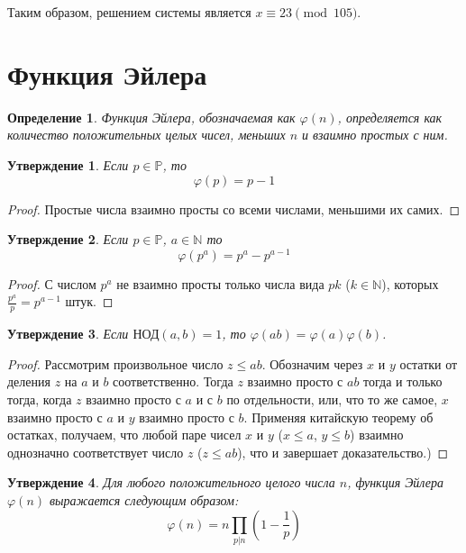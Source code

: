 \documentclass[12pt, a4paper, openany]{book}
\newtheorem*{definition}{Определение}
\newtheorem*{statement}{Утверждение}
\begin{document}
\noindent
    Таким образом, решением системы является $x \equiv 23 \pmod{105}$.

\section{Функция Эйлера}

\begin{definition}
    Функция Эйлера, обозначаемая как $\varphi(n)$, определяется как количество положительных целых чисел, меньших $n$ и взаимно простых с ним.
\end{definition}

\begin{statement}
    Если $p \in \mathbb{P}$, то 
    \[
    \varphi(p) = p - 1
    \]
\end{statement}
    
\begin{proof}
    Простые числа взаимно просты со всеми числами, меньшими их самих.
\end{proof}

\begin{statement}
    Если $p \in \mathbb{P}$, $a \in \mathbb{N}$ то 
    \[
    \varphi(p^a) = p^a - p^{a-1}
    \]
\end{statement}

\begin{proof}
    С числом $p^a$ не взаимно просты только числа вида $pk$ ($k \in \mathbb{N}$), которых $\frac{p^a}{p} = p^{a-1}$ штук.
\end{proof}

\begin{statement}
    Если $\text{НОД}(a, b) = 1$, то $\varphi(ab) = \varphi(a)\varphi(b)$.
\end{statement}

\begin{proof}
    Рассмотрим произвольное число $z \le ab$. Обозначим через $x$ и $y$ остатки от деления $z$ на $a$ и $b$ соответственно. Тогда $z$ взаимно просто с $ab$ тогда и только тогда, когда $z$ взаимно просто с $a$ и с $b$ по отдельности, или, что то же самое, $x$ взаимно просто с $a$ и $y$ взаимно просто с $b$. Применяя китайскую теорему об остатках, получаем, что любой паре чисел $x$ и $y$ ($x \le a$, $y \le b$) взаимно однозначно соответствует число $z$ ($z \le ab$), что и завершает доказательство.)
\end{proof}

\begin{statement}
    Для любого положительного целого числа $n$, функция Эйлера $\varphi(n)$ выражается следующим образом:
    \[
    \varphi(n) = n \prod_{p|n} \left(1 - \frac{1}{p}\right)
    \]
\end{statement}
\end{document}
